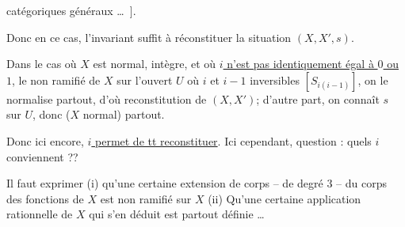 catégoriques généraux \ldots\ ].

Donc en ce cas, l'invariant suffit à réconstituer  la situation $(X,X',s)$.

Dans le cas où $X$ est normal, intègre, et où \uline{$i$ n'est pas identiquement égal à $0$ ou $1$},  le  non ramifié de $X$ sur l'ouvert $U$ où $i$ et $i-1$ inversibles $[S_{i(i-1)}]$, on le normalise partout, d'où reconstitution de $(X,X')$; d'autre part, on connaît $s$ sur $U$, donc ($X$ normal) partout.

Donc ici encore, \uline{$i$ permet de tt reconstituer}. Ici cependant,  question : quels $i$ conviennent ??

Il faut exprimer (i) qu'une certaine extension de corps -- de degré $3$ -- du corps des fonctions de $X$ est non ramifié sur $X$ (ii) Qu'une certaine application rationnelle de $X$ qui s'en déduit est partout définie \ldots
{}

